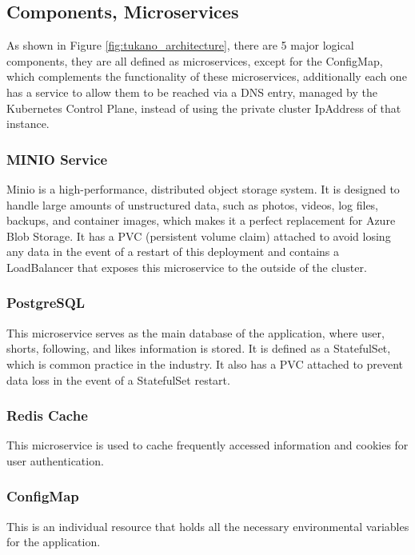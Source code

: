 \documentclass[10pt,a4paper,twocolumn]{article}
\begin{document}
\subsection{Components, Microservices}
As shown in Figure \ref{fig:tukano_architecture}, there are 5 major logical components, they are all defined as microservices, except for the ConfigMap, which complements the functionality of these microservices, additionally each one has a service to allow them to be reached via a DNS entry, managed by the Kubernetes Control Plane, instead of using the private cluster IpAddress of that instance.
\subsubsection{MINIO Service}
Minio\cite{minio} is a high-performance, distributed object storage system. It is designed to handle large amounts of unstructured data, such as photos, videos, log files, backups, and container images, which makes it a perfect replacement for Azure Blob Storage. It has a PVC (persistent volume claim) attached to avoid losing any data in the event of a restart of this deployment and contains a LoadBalancer that exposes this microservice to the outside of the cluster.

\subsubsection{PostgreSQL}
This microservice serves as the main database of the application, where user, shorts, following, and likes information is stored. It is defined as a StatefulSet, which is common practice in the industry. It also has a PVC attached to prevent data loss in the event of a StatefulSet restart.

\subsubsection{Redis Cache}
This microservice is used to cache frequently accessed information and cookies for user authentication.

\subsubsection{ConfigMap}
This is an individual resource that holds all the necessary environmental variables for the application.
\end{document}

